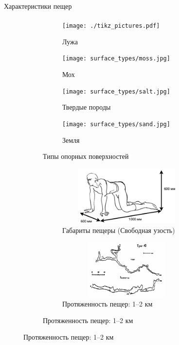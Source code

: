 \begin{frame}[t]{Характеристики пещер}
    \framesubtitle{}
    \vspace{-0.8cm}
    \begin{figure}[H]
        \begin{subfigure}{0.49\textwidth}
            \begin{subfigure}[b]{0.49\textwidth}
                \centering\texttt{[image: ./tikz\_pictures.pdf]}
                \caption{Лужа}
            \end{subfigure}
            \hfill
            \begin{subfigure}[b]{0.49\textwidth}
                \centering\texttt{[image: surface\_types/moss.jpg]}\\
                \caption{Мох}
            \end{subfigure}

            \begin{subfigure}[b]{0.49\textwidth}
                \centering\texttt{[image: surface\_types/salt.jpg]}\\
                \caption{Твердые породы}
            \end{subfigure}
            \begin{subfigure}[b]{0.49\textwidth}
                \centering\texttt{[image: surface\_types/sand.jpg]}\\
                \caption{Земля}
            \end{subfigure}
            \caption*{Типы опорных поверхностей}
        \end{subfigure}
        \begin{subfigure}{0.49\textwidth}
            \begin{subfigure}{0.99\textwidth}
                \centering\includegraphics[height=3cm,width=1\textwidth,keepaspectratio]{../images/human_crawling.png}
                \caption*{Габариты пещеры (Свободная узость)}
            \end{subfigure}

            \begin{subfigure}{0.99\textwidth}
                \centering\includegraphics[height=3cm,width=1\textwidth,keepaspectratio]{../images/cave_maps/map3.png}
                \caption*{Протяженность пещер: 1--2 км}
            \end{subfigure}
        \end{subfigure}
    \end{figure}
\end{frame}

